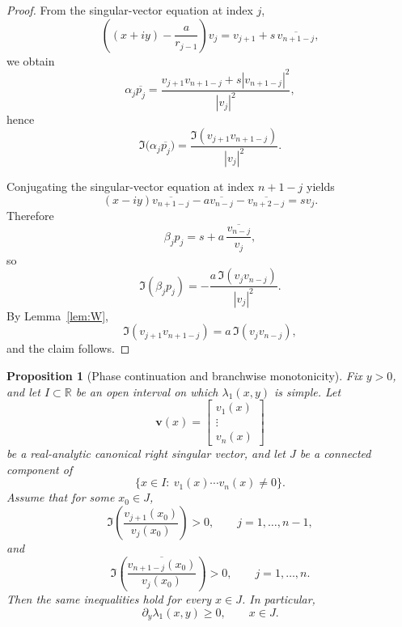 \documentclass[11pt]{article}
\numberwithin{equation}{section}
\newtheorem{proposition}[theorem]{Proposition}
\newcommand{\R}{\mathbb R}
\begin{document}
\begin{proof}
From the singular-vector equation at index \(j\),
\[
\left((x+iy)-\frac{a}{r_{j-1}}\right)v_j
=
v_{j+1}+s\,\overline{v_{n+1-j}},
\]
we obtain
\[
\alpha_j\overline{p_j}
=
\frac{v_{j+1}v_{n+1-j}+s|v_{n+1-j}|^2}{|v_j|^2},
\]
hence
\[
\Im\!\bigl(\alpha_j\overline{p_j}\bigr)
=
\frac{\Im(v_{j+1}v_{n+1-j})}{|v_j|^2}.
\]

Conjugating the singular-vector equation at index \(n+1-j\) yields
\[
(x-iy)\overline{v_{n+1-j}}
-
a\overline{v_{n-j}}
-
\overline{v_{n+2-j}}
=
sv_j.
\]
Therefore
\[
\beta_j p_j
=
s+a\,\frac{\overline{v_{n-j}}}{v_j},
\]
so
\[
\Im(\beta_j p_j)
=
-\frac{a\,\Im(v_jv_{n-j})}{|v_j|^2}.
\]
By Lemma~\ref{lem:W},
\[
\Im(v_{j+1}v_{n+1-j})=a\,\Im(v_jv_{n-j}),
\]
and the claim follows.
\end{proof}

\begin{proposition}[Phase continuation and branchwise monotonicity]
\label{prop:continuation}
Fix \(y>0\), and let \(I\subset\R\) be an open interval on which
\(\lambda_1(x,y)\) is simple.  Let
\[
\bm v(x)=
\begin{bmatrix}
v_1(x)\\
\vdots\\
v_n(x)
\end{bmatrix}
\]
be a real-analytic canonical right singular vector, and let \(J\) be a connected
component of
\[
\{x\in I:\ v_1(x)\cdots v_n(x)\neq0\}.
\]
Assume that for some \(x_0\in J\),
\[
\Im\!\left(\frac{v_{j+1}(x_0)}{v_j(x_0)}\right)>0,
\qquad j=1,\dots,n-1,
\]
and
\[
\Im\!\left(\frac{\overline{v_{n+1-j}(x_0)}}{v_j(x_0)}\right)>0,
\qquad j=1,\dots,n.
\]
Then the same inequalities hold for every \(x\in J\).  In particular,
\[
\partial_y\lambda_1(x,y)\ge0,
\qquad x\in J.
\]
\end{proposition}
\end{document}
